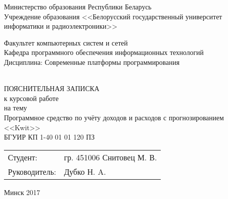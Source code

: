 \begin{titlepage}
  \begin{center}
    Министерство образования Республики Беларусь\\[0.4em]
    Учреждение образования <<Белорусский государственный университет информатики
    и радиоэлектроники>>\\[3.5em]

    \begin{minipage}{\textwidth}
      \begin{center}
          Факультет компьютерных систем и сетей\\[1em]
          Кафедра программного обеспечения информационных технологий\\[1em]
          Дисциплина: Современные платформы программирования
      \end{center}
    \end{minipage}\\[3em]
    ПОЯСНИТЕЛЬНАЯ ЗАПИСКА\\
    к курсовой работе\\
    на тему\\[1em]
    Программное средство по учёту доходов и расходов с прогнозированием \\ <<Kwit>>\\[1em]
    БГУИР КП 1-40 01 01 120 ПЗ
    \vspace{8em}

    \begin{flushright}
        \begin{minipage}{10cm}
        	\begin{tabular}{p{3cm} p{6.1cm}} 
        	Студент: & гр. 451006 Снитовец М. В. \\[1.4em]
            Руководитель: & Дубко Н. A.
            \end{tabular}
        \end{minipage}
    \end{flushright}

    \vfill
    {\normalsize Минск 2017}
  \end{center}
\end{titlepage}

